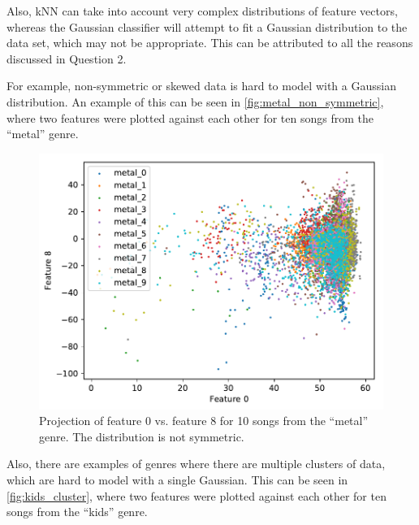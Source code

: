 \documentclass[a4paper,titlepage]{article}
\begin{document}
	Also, kNN can take into account very complex distributions of feature vectors, whereas the Gaussian classifier will attempt to fit a Gaussian distribution to the data set, which may not be appropriate. This can be attributed to all the reasons discussed in Question 2.
	
	For example, non-symmetric or skewed data is hard to model with a Gaussian distribution. An example of this can be seen in \autoref{fig:metal_non_symmetric}, where two features were plotted against each other for ten songs from the ``metal'' genre.
	
	
	\begin{figure}[!htb]
		\centering
		\includegraphics[width=\columnwidth]{plots/metal_non_symmetric.pdf}
		\caption
		{Projection of feature 0 vs. feature 8 for 10 songs from the ``metal'' genre. The distribution is not symmetric.}
		\label{fig:metal_non_symmetric}
	\end{figure}

	Also, there are examples of genres where there are multiple clusters of data, which are hard to model with a single Gaussian. This can be seen in \autoref{fig:kids_cluster}, where two features were plotted against each other for ten songs from the ``kids'' genre.
	
	
\end{document}
